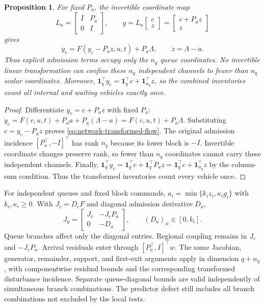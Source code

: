 \documentclass[preprint,12pt]{elsarticle}
\newtheorem{proposition}{Proposition}
\begin{document}
\begin{proposition}
\label{prop:network-localization}
For fixed $P_a$, the invertible coordinate map
\begin{equation}
 L_a=\begin{bmatrix}I&P_a\\0&I\end{bmatrix},\qquad
 y=L_a\begin{bmatrix}c\\z\end{bmatrix}
   =\begin{bmatrix}c+P_a z\\z\end{bmatrix}
 \label{eq:network-transform}
\end{equation}
gives
\begin{equation}
 \dot y_c=F(y_c-P_a z,u,t)+P_a\Lambda,\qquad
 \dot z=\Lambda-a.
 \label{eq:network-transformed-flow}
\end{equation}
Thus explicit admission terms occupy only the $n_q$ queue coordinates. No
invertible linear transformation can confine these $n_q$ independent channels
to fewer than $n_q$ scalar coordinates. Moreover,
$\mathbf1_q^\top y_c=\mathbf1_q^\top c+\mathbf1_{n_q}^\top z$, so the combined
inventories count all internal and waiting vehicles exactly once.
\end{proposition}

\begin{proof}
Differentiate $y_c=c+P_a z$ with fixed $P_a$:
$\dot y_c=F(c,u,t)+P_a a+P_a(\Lambda-a)=F(c,u,t)+P_a\Lambda$.
Substituting $c=y_c-P_a z$ proves
\eqref{eq:network-transformed-flow}. The original admission incidence
$[P_a^\top,-I]^\top$ has rank $n_q$ because its lower block is $-I$.
Invertible coordinate changes preserve rank, so fewer than $n_q$ coordinates
cannot carry these independent channels. Finally,
$\mathbf1_q^\top y_c=\mathbf1_q^\top c+\mathbf1_q^\top P_a z
=\mathbf1_q^\top c+\mathbf1_{n_q}^\top z$ by the column-sum condition.
Thus the transformed inventories count every vehicle once.
\end{proof}

For independent queues and fixed block commands,
$a_i=\min\{k_i z_i,\kappa_i g_i\}$ with $k_i,\kappa_i\ge0$. With
$J_c=D_cF$ and diagonal admission derivative $D_a$,
\begin{equation}
 J_y=\begin{bmatrix}J_c&-J_cP_a\\0&-D_a\end{bmatrix},
 \qquad (D_a)_{ii}\in[0,k_i].
 \label{eq:network-jacobian}
\end{equation}
Queue branches affect only the diagonal entries. Regional coupling remains
in $J_c$ and $-J_cP_a$. Arrival residuals enter through
$[P_a^\top,I]^\top w$. The same Jacobian, generator, remainder, support,
and first-exit arguments apply in dimension $q+n_q$, with componentwise
residual bounds and the corresponding transformed disturbance incidence.
Separate queue-diagonal bounds are valid independently of simultaneous
branch combinations. The predictor defect still includes all branch
combinations not excluded by the local tests.
\end{document}
